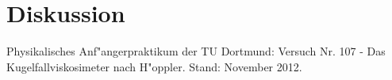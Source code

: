 \newpage
\section{Diskussion}
	\label{sec:diskussion}

\begin{thebibliography}{9}
	 Physikalisches Anf"angerpraktikum der TU Dortmund: Versuch Nr. 107 - Das Kugelfallviskosimeter nach H"oppler. Stand: November 2012.
\end{thebibliography}